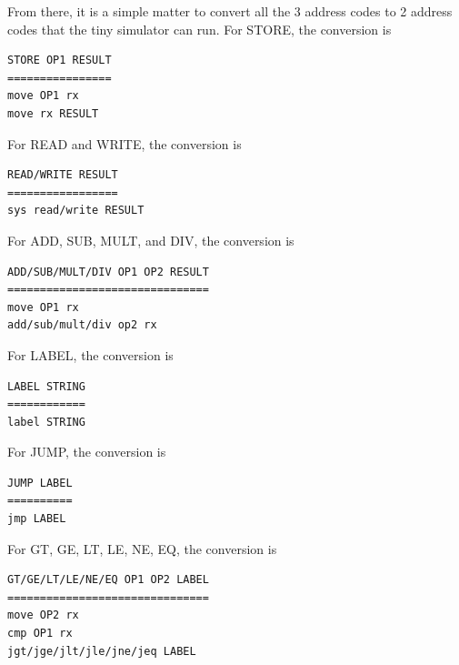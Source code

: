 \documentclass[12pt]{article}
\begin{document}
            From there, it is a simple matter to convert all the 3 address codes to 2 address codes that the tiny simulator can run.
            For STORE, the conversion is
            \begin{verbatim}
STORE OP1 RESULT
================
move OP1 rx
move rx RESULT
            \end{verbatim}

            For READ and WRITE, the conversion is
            \begin{verbatim}
READ/WRITE RESULT
=================
sys read/write RESULT
            \end{verbatim}

            For ADD, SUB, MULT, and DIV, the conversion is
            \begin{verbatim}
ADD/SUB/MULT/DIV OP1 OP2 RESULT
===============================
move OP1 rx
add/sub/mult/div op2 rx
            \end{verbatim}

            For LABEL, the conversion is
            \begin{verbatim}
LABEL STRING
============
label STRING
            \end{verbatim}

            For JUMP, the conversion is
            \begin{verbatim}
JUMP LABEL
==========
jmp LABEL
            \end{verbatim}

            For GT, GE, LT, LE, NE, EQ, the conversion is
            \begin{verbatim}
GT/GE/LT/LE/NE/EQ OP1 OP2 LABEL
===============================
move OP2 rx
cmp OP1 rx
jgt/jge/jlt/jle/jne/jeq LABEL
            \end{verbatim}
\end{document}
